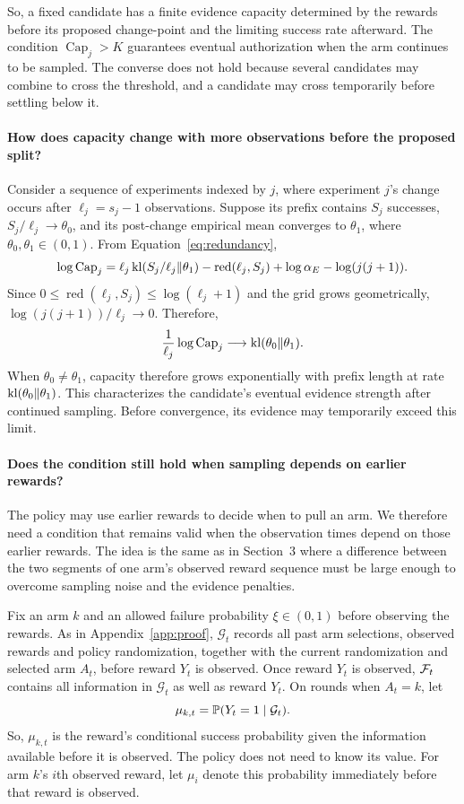 So, a fixed candidate has a finite evidence capacity determined by the
rewards before its proposed change-point and the limiting success rate
afterward.
The condition $\operatorname{Cap}_j>K$ guarantees eventual
authorization when the arm continues to be sampled.
The converse does not hold because several candidates may combine to cross the threshold, and a
candidate may cross temporarily before settling below it.

\paragraph{How does capacity change with more observations before the proposed split?}
Consider a sequence of experiments indexed by $j$, where experiment $j$'s
change occurs after $\ell_j=s_j-1$ observations.
Suppose its prefix contains $S_j$ successes, $S_j/\ell_j\to\theta_0$, and its post-change empirical mean
converges to $\theta_1$, where $\theta_0,\theta_1\in(0,1)$.
From Equation~\eqref{eq:redundancy},
\[
\log\operatorname{Cap}_j
=
\ell_j\operatorname{kl}(S_j/\ell_j\Vert\theta_1)
-\operatorname{red}(\ell_j,S_j)
+\log\alpha_E-\log(j(j+1)).
\]
Since $0\leq\operatorname{red}(\ell_j,S_j)\leq\log(\ell_j+1)$ and the grid
grows geometrically, $\log(j(j+1))/\ell_j\to0$.
Therefore,
\[
\frac{1}{\ell_j}\log\operatorname{Cap}_j
\longrightarrow
\operatorname{kl}(\theta_0\Vert\theta_1).
\]
When $\theta_0\neq\theta_1$, capacity therefore grows exponentially with
prefix length at rate $\operatorname{kl}(\theta_0\Vert\theta_1)$.
This characterizes the candidate's eventual evidence strength after continued sampling.
Before convergence, its evidence may temporarily exceed this limit.

\paragraph{Does the condition still hold when sampling depends on earlier rewards?}

The policy may use earlier rewards to decide when to pull an arm.
We therefore need a condition that remains valid when the observation
times depend on those earlier rewards.
The idea is the same as in Section~3 where a difference
between the two segments of one arm's observed reward sequence must be large enough to overcome sampling
noise and the evidence penalties.

Fix an arm $k$ and an allowed failure probability $\xi\in(0,1)$
before observing the rewards.
As in Appendix~\ref{app:proof}, $\mathcal G_t$ records all past arm
selections, observed rewards and policy randomization, together with
the current randomization and selected arm $A_t$, before reward $Y_t$
is observed.
Once reward $Y_t$ is observed, $\mathcal F_t$ contains all information in $\mathcal G_t$
as well as reward $Y_t$.
On rounds when $A_t=k$, let
\[
\mu_{k,t}=\mathbb P(Y_t=1\mid\mathcal G_t).
\]
So, $\mu_{k,t}$ is the reward's conditional success probability
given the information available before it is observed.
The policy does not need to know its value.
For arm $k$'s $i$th observed reward, let $\mu_i$ denote this probability
immediately before that reward is observed.

